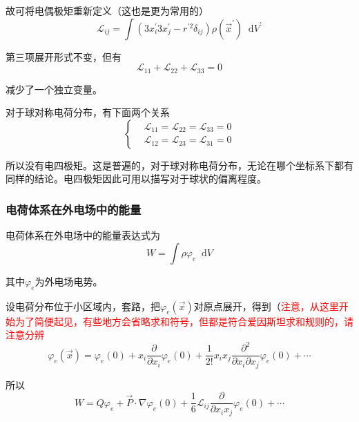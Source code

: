 \documentclass[UTF8]{ctexart}
\newcommand*{\dif}{\mathop{}\!\mathrm{d}}
\newcommand{\red}{\textcolor{red}}
\begin{document}
\noindent 故可将电偶极矩重新定义（这也是更为常用的）
\begin{equation}
    \mathscr{L}_{ij} = \int \left(3 x_i^{\prime} 3 x_j^{\prime} - r^{\prime 2} \delta_{ij}\right) \rho(\vec{x}^{\prime}) \dif V^{\prime}
\end{equation}

\noindent 第三项展开形式不变，但有
\begin{equation}
    \mathscr{L}_{11}+ \mathscr{L}_{22} + \mathscr{L}_{33} = 0
\end{equation}

\noindent 减少了一个独立变量。

    对于球对称电荷分布，有下面两个关系
    \begin{equation}
        \left \{ \begin{aligned}
            &\mathscr{L}_{11} = \mathscr{L}_{22} =\mathscr{L}_{33} = 0 \\
            &\mathscr{L}_{12} = \mathscr{L}_{23} =\mathscr{L}_{31} = 0
        \end{aligned} \right.
    \end{equation}

\noindent 所以没有电四极矩。这是普遍的，对于球对称电荷分布，无论在哪个坐标系下都有同样的结论。电四极矩因此可用以描写对于球状的偏离程度。

    \subsubsection{电荷体系在外电场中的能量}
    电荷体系在外电场中的能量表达式为
    \begin{equation}
        W = \int \rho \varphi_e \dif V 
    \end{equation}

\noindent 其中$\varphi_e$为外电场电势。

    设电荷分布位于小区域内，套路，把$\varphi_e(\vec{x})$对原点展开，得到（\red{注意，从这里开始为了简便起见，有些地方会省略求和符号，但都是符合爱因斯坦求和规则的，请注意分辨}
    \begin{equation}
        \varphi_e(\vec{x}) = \varphi_e(0) + x_i \frac{\partial}{\partial x_i} \varphi_e(0) + \frac{1}{2!} x_i x_j \frac{\partial^2}{\partial x_i \partial x_j} \varphi_e(0) + \cdots 
    \end{equation}

\noindent 所以 
\begin{equation}
    W = Q \varphi_e + \vec{P} \cdot \nabla \varphi_e(0) + \frac{1}{6} \mathscr{L}_{ij} \frac{\partial}{\partial x_i x_j} \varphi_e(0) + \cdots 
\end{equation}
\end{document}
